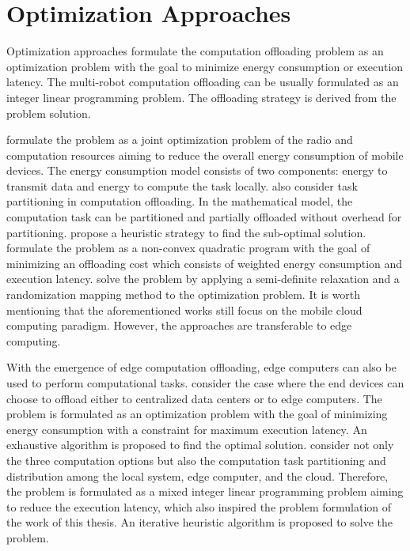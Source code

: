 \section{Optimization Approaches}\label{sec:optimization_approaches}

Optimization approaches formulate the computation offloading problem as an optimization problem with the goal to minimize energy consumption or execution latency. The multi-robot computation offloading can be usually formulated as an integer linear programming problem. The offloading strategy is derived from the problem solution. 

\citeauthor*{Zhao2015} \cite{Zhao2015} formulate the problem as a joint optimization problem of the radio and computation resources aiming to reduce the overall energy consumption of mobile devices. The energy consumption model consists of two components: energy to transmit data and energy to compute the task locally. \citeauthor*{Zhao2015} also consider task partitioning in computation offloading. In the mathematical model, the computation task can be partitioned and partially offloaded without overhead for partitioning. \citeauthor*{Zhao2015} propose a heuristic strategy to find the sub-optimal solution. \citeauthor*{Chen2015} \cite{Chen2015} formulate the problem as a non-convex quadratic program with the goal of minimizing an offloading cost which consists of weighted energy consumption and execution latency. \citeauthor*{Chen2015} solve the problem by applying a semi-definite relaxation and a randomization mapping method to the optimization problem. It is worth mentioning that the aforementioned works still focus on the mobile cloud computing paradigm. However, the approaches are transferable to edge computing. 

With the emergence of edge computation offloading, edge computers can also be used to perform computational tasks. \citeauthor*{Guo2018} \cite{Guo2018} consider the case where the end devices can choose to offload either to centralized data centers or to edge computers. The problem is formulated as an optimization problem with the goal of minimizing energy consumption with a constraint for maximum execution latency. An exhaustive algorithm is proposed to find the optimal solution. \citeauthor*{Ning2019} \cite{Ning2019} consider not only the three computation options but also the computation task partitioning and distribution among the local system, edge computer, and the cloud. Therefore, the problem is formulated as a mixed integer linear programming problem aiming to reduce the execution latency, which also inspired the problem formulation of the work of this thesis. An iterative heuristic algorithm is proposed to solve the problem. 

